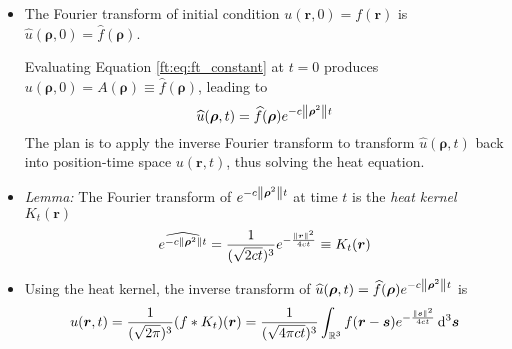 \documentclass[11pt, a4paper]{article}
\newcommand{\R}{\mathbb{R}} %
\newcommand{\diff}{\mathop{}\!\mathrm{d}} %
\begin{document}
\begin{itemize}
	\item The Fourier transform of initial condition $ u(\bm{r}, 0) = f(\bm{r})$ is $ \widehat{u}(\bm{\rho}, 0) = \widehat{f}(\bm{\rho}) $.
	
	Evaluating Equation \ref{ft:eq:ft_constant} at $ t = 0 $ produces  $ u(\bm{\rho}, 0) = A(\bm{\rho}) \equiv \widehat{f}(\bm{\rho}) $, leading to
	\begin{equation*}
		\widehat{u}(\bm{\rho}, t) = \widehat{f}(\bm{\rho})   e^{-c\norm{\bm{\rho}^2}t }
	\end{equation*}
	The plan is to apply the inverse Fourier transform to transform $ \widehat{u}(\bm{\rho}, t) $ back into position-time space $ u(\bm{r}, t) $, thus solving the heat equation.
	
	\item \textit{Lemma:} The Fourier transform of $  e^{-c\norm{\bm{\rho}^2}t } $ at time $ t $ is the \textit{heat kernel} $ K_{t}(\bm{r}) $
	\begin{equation*}
		\F{ e^{-c\norm{\bm{\rho}^2}t }} = \frac{1}{(\sqrt{2ct})^3} e^{-\frac{\norm{\bm{r}}^2}{4ct}} \equiv K_{t}(\bm{r}) 
	\end{equation*}
	
	\item Using the heat kernel, the inverse transform of $ \displaystyle{\widehat{u}(\bm{\rho}, t) = \widehat{f}(\bm{\rho})   e^{-c\norm{\bm{\rho}^2}t }} $ is
	\begin{equation*}
		u(\bm{r}, t) = \frac{1}{(\sqrt{2\pi})^3} (f*K_{t})(\bm{r}) = \frac{1}{(\sqrt{4\pi ct})^3} \int_{\R^3}f(\bm{r} - \bm{s})e^{-\frac{\norm{\bm{s}}^2}{4ct}}\diff^{3} \bm{s}
	\end{equation*}
\end{itemize}
\end{document}
